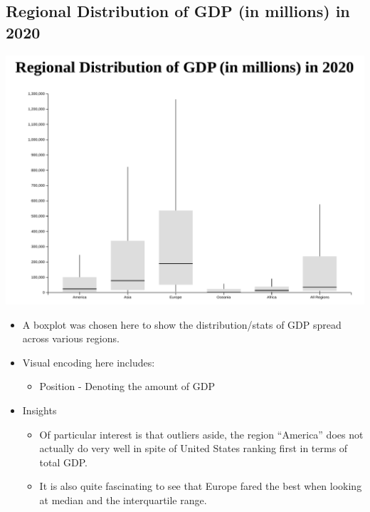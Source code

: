 \documentclass[a4paper, 11pt]{article}
\begin{document}
\subsection{Regional Distribution of GDP (in millions) in 2020}
\label{sec:org03fb628}
\begin{center}
\includegraphics[width=.9\linewidth]{./charts/gdp_boxplot.png}
\end{center}
\begin{itemize}
\item A boxplot was chosen here to show the distribution/stats of GDP spread across various regions.
\item Visual encoding here includes:
\begin{itemize}
\item Position - Denoting the amount of GDP
\end{itemize}
\item Insights
\begin{itemize}
\item Of particular interest is that outliers aside, the region ``America'' does not actually do very well in spite of United States ranking first in terms of total GDP.
\item It is also quite fascinating to see that Europe fared the best when looking at median and the interquartile range.
\end{itemize}
\end{itemize}
\end{document}

